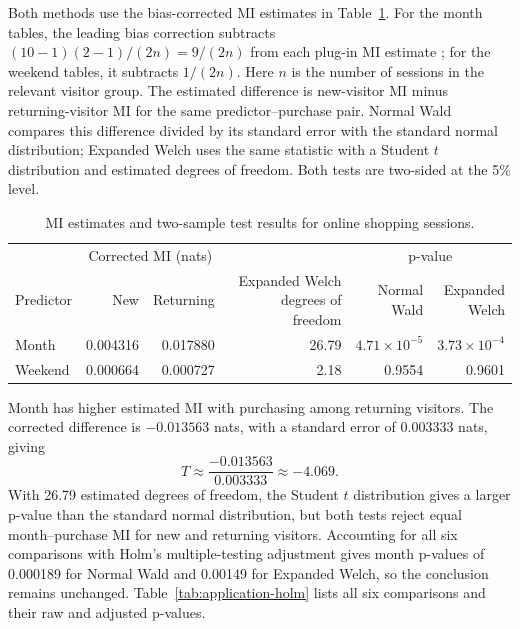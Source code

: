 Both methods use the bias-corrected MI estimates in
Table~\ref{tab:shoppers-application}. For the month tables, the leading
bias correction subtracts \((10-1)(2-1)/(2n)=9/(2n)\) from each plug-in
MI estimate \citep{miller1955,moddemeijer1989};
for the weekend tables, it subtracts \(1/(2n)\). Here \(n\) is the
number of sessions in the relevant visitor group. The estimated
difference is new-visitor MI minus returning-visitor MI for the same
predictor--purchase pair. Normal Wald
compares this difference divided by its standard error with the standard
normal distribution; Expanded Welch uses the same statistic with a
Student \(t\) distribution and estimated degrees of freedom. Both tests
are two-sided at the 5\% level.

\begin{table}[H]
\centering
\caption{MI estimates and two-sample test results for online shopping sessions.}
\label{tab:shoppers-application}
\begingroup
\setlength{\tabcolsep}{4pt}
\begin{tabular}{@{}lrrrrr@{}}
\toprule
 & \multicolumn{2}{c}{Corrected MI (nats)} & & \multicolumn{2}{c}{p-value}\\
\cmidrule(lr){2-3}\cmidrule(l){5-6}
Predictor & New & Returning & \shortstack{Expanded Welch\\degrees of freedom}
 & \shortstack{Normal\\Wald} & \shortstack{Expanded\\Welch}\\
\midrule
Month & 0.004316 & 0.017880 & 26.79 & \(4.71\times10^{-5}\) & \(3.73\times10^{-4}\)\\
Weekend & 0.000664 & 0.000727 & 2.18 & 0.9554 & 0.9601\\
\bottomrule
\end{tabular}
\endgroup
\end{table}

Month has higher estimated MI with purchasing among returning visitors.
The corrected difference is \(-0.013563\) nats, with a standard error of
\(0.003333\) nats, giving
\begin{equation}
  T\approx\frac{-0.013563}{0.003333}\approx-4.069.
  \label{eq:shoppers-month-statistic}
\end{equation}
With 26.79 estimated degrees of freedom, the Student \(t\) distribution gives
a larger p-value than the standard normal distribution, but both tests
reject equal month--purchase MI for new and returning visitors. Accounting
for all six comparisons with Holm's multiple-testing adjustment \citep{holm1979}
gives month p-values of 0.000189 for Normal Wald and 0.00149 for Expanded
Welch, so the conclusion remains unchanged.
Table~\ref{tab:application-holm} lists all six comparisons and their raw
and adjusted p-values.

